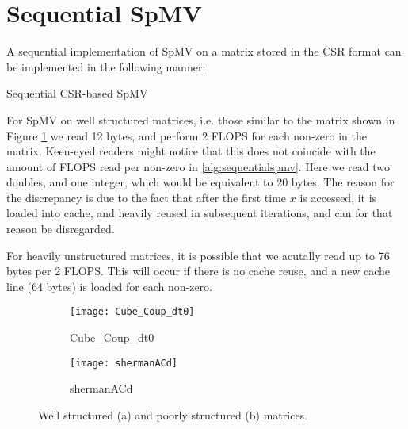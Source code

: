 \section{Sequential SpMV}
A sequential implementation of SpMV on a matrix stored in the CSR format can be implemented in the following manner:
\medskip

\begin{algorithm}[htbp]
    \caption{Sequential CSR-based SpMV}
    \SetAlgoVlined

\end{algorithm}
\label{alg:sequentialspmv}
\medskip

For SpMV on well structured matrices, i.e. those similar to the matrix shown in Figure \ref{fig:Cube_Coup_dt0}  we read 12 bytes, and perform 2 FLOPS for each non-zero in the matrix. Keen-eyed readers might notice that this does not coincide with the amount of FLOPS read per non-zero in \autoref{alg:sequentialspmv}. Here we read two doubles, and one integer, which would be equivalent to 20 bytes. The reason for the discrepancy is due to the fact that after the first time \(x\) is accessed, it is loaded into cache, and heavily reused in subsequent iterations, and can for that reason be disregarded.

For heavily unstructured matrices, it is possible that we acutally read up to 76 bytes per 2 FLOPS. This will occur if there is no cache reuse, and a new cache line (64 bytes) is loaded for each non-zero.


\begin{figure}[H]
    \centering
    \begin{subfigure}[t]{0.45\textwidth}
        \centering
        \texttt{[image: Cube\_Coup\_dt0]}
        \caption{Cube\_Coup\_dt0}
    \end{subfigure}
    \hfill
    \begin{subfigure}[t]{0.45\textwidth}
        \centering
        \texttt{[image: shermanACd]}
        \caption{shermanACd}
    \end{subfigure}
    \caption{Well structured (a) and poorly structured (b) matrices.}
    \label{fig:Cube_Coup_dt0}
\end{figure}

